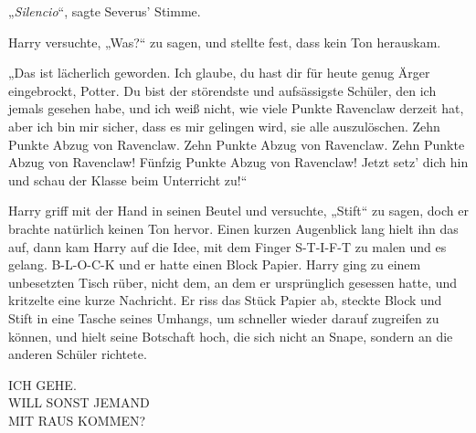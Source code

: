„\emph{Silencio}“, sagte Severus’ Stimme.

Harry versuchte, „Was?“ zu sagen, und stellte fest, dass kein Ton herauskam.

„Das ist lächerlich geworden. Ich glaube, du hast dir für heute genug Ärger eingebrockt, Potter. Du bist der störendste und aufsässigste Schüler, den ich jemals gesehen habe, und ich weiß nicht, wie viele Punkte Ravenclaw derzeit hat, aber ich bin mir sicher, dass es mir gelingen wird, sie alle auszulöschen. Zehn Punkte Abzug von Ravenclaw. Zehn Punkte Abzug von Ravenclaw. Zehn Punkte Abzug von Ravenclaw! Fünfzig Punkte Abzug von Ravenclaw! Jetzt setz’ dich hin und schau der Klasse beim Unterricht zu!“

Harry griff mit der Hand in seinen Beutel und versuchte, „Stift“ zu sagen, doch er brachte natürlich keinen Ton hervor. Einen kurzen Augenblick lang hielt ihn das auf, dann kam Harry auf die Idee, mit dem Finger S-T-I-F-T zu malen und es gelang. B-L-O-C-K und er hatte einen Block Papier. Harry ging zu einem unbesetzten Tisch rüber, nicht dem, an dem er ursprünglich gesessen hatte, und kritzelte eine kurze Nachricht. Er riss das Stück Papier ab, steckte Block und Stift in eine Tasche seines Umhangs, um schneller wieder darauf zugreifen zu können, und hielt seine Botschaft hoch, die sich nicht an Snape, sondern an die anderen Schüler richtete.

\begin{writtenNote}
ICH GEHE.\\
WILL SONST JEMAND\\
MIT RAUS KOMMEN?
\end{writtenNote}

